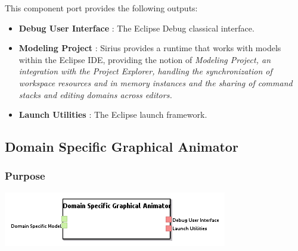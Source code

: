 \documentclass{gemoc} %
\begin{document}
This component port provides the following outputs:
\begin{itemize}
  \item \textbf{Debug User Interface} :
The Eclipse Debug classical interface.
  \item \textbf{Modeling Project} :
Sirius provides a runtime that works with models within the Eclipse IDE, providing the notion of \em{Modeling Project}, an integration with the Project Explorer, handling the synchronization of workspace resources and in memory instances and the sharing of command stacks and editing domains across editors.
  \item \textbf{Launch Utilities} :
The Eclipse launch framework.
\end{itemize}


\subsection{Domain Specific Graphical Animator}


\subsubsection{Purpose}


\begin{center}
\includegraphics*[trim=0.0cm 0.0cm 0cm 0.0cm, clip=true]{../images/generated/Generated_Domain_Specific_Graphical_Animator.png}
\end{center}
\end{document}

